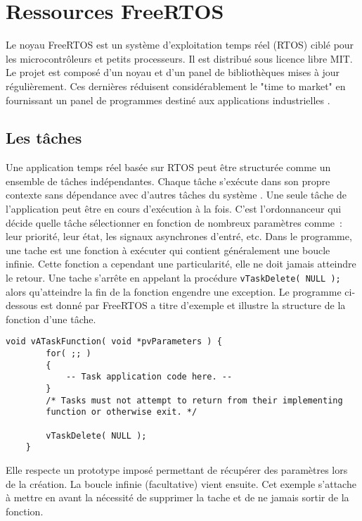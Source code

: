 \section{Ressources FreeRTOS}


Le noyau FreeRTOS est un système d'exploitation temps réel (RTOS) ciblé pour les microcontrôleurs et petits processeurs.
Il est distribué sous licence libre MIT.
Le projet est composé d'un noyau et d'un panel de bibliothèques mises à jour régulièrement.
Ces dernières réduisent considérablement le "time to market" en fournissant un panel de programmes destiné aux applications industrielles \cite{web_freeRTOS}.

\subsection{Les tâches}
Une application temps réel basée sur RTOS peut être structurée comme un ensemble de tâches indépendantes. 
Chaque tâche s'exécute dans son propre contexte sans dépendance avec d'autres tâches du système \cite{web_freeRTOS_task}.
Une seule tâche de l'application peut être en cours d'exécution à la fois.
C'est l'ordonnanceur qui décide quelle tâche sélectionner en fonction de nombreux paramètres comme : leur priorité, leur état, les signaux asynchrones d'entré, etc. 
Dans le programme, une tache est une fonction à exécuter qui contient généralement une boucle infinie.
Cette fonction a cependant une particularité, elle ne doit jamais atteindre le retour.
Une tache s'arrête en appelant la procédure \texttt{vTaskDelete( NULL );} alors qu'atteindre la fin de la fonction engendre une exception.
Le programme ci-dessous est donné par FreeRTOS \cite{web_freeRTOS_task} a titre d'exemple et illustre la structure de la fonction d'une tâche.
\begin{lstlisting}[style=CStyle]
    void vATaskFunction( void *pvParameters ) {
        for( ;; )
        {
            -- Task application code here. --
        }
        /* Tasks must not attempt to return from their implementing
        function or otherwise exit. */

        vTaskDelete( NULL );
    }
\end{lstlisting}
Elle respecte un prototype imposé permettant de récupérer des paramètres lors de la création.
La boucle infinie (facultative) vient ensuite.
Cet exemple s'attache à mettre en avant la nécessité de supprimer la tache et de ne jamais sortir de la fonction.

